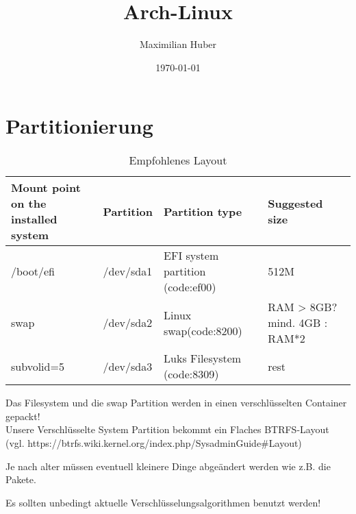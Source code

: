 \documentclass[11pt,a4paper]{article}
\author{Maximilian Huber}
\title{Arch-Linux}
\date{\today}
\begin{document}
\begin{titlepage}
\maketitle
\thispagestyle{empty}
\end{titlepage}

\tableofcontents
\thispagestyle{empty}	
\cleardoublepage
\setcounter{page}{1}

\section{Partitionierung}
\begin{table}[h]
\begin{tabular}{|p{3cm}|p{3cm}|p{3cm}| p{3cm} |}
\hline
Mount point on the installed system & Partition & Partition type   &  Suggested size \\ \hline
/boot/efi & /dev/sda1  & EFI system partition (code:ef00)  & 512M \\ \hline
swap & /dev/sda2  & Linux swap(code:8200)  & RAM > 8GB? mind. 4GB : RAM*2 \\ \hline
subvolid=5 & /dev/sda3  & Luks Filesystem (code:8309)  & rest  \\ \hline
\end{tabular}
\caption{Empfohlenes Layout}
\end{table}

Das Filesystem und die swap Partition werden in einen verschlüsselten Container gepackt!\\

Unsere Verschlüsselte System Partition bekommt ein Flaches BTRFS-Layout (vgl. https://btrfs.wiki.kernel.org/index.php/SysadminGuide\#Layout)

Je nach alter müssen eventuell kleinere Dinge abgeändert werden wie z.B. die Pakete.

Es sollten unbedingt aktuelle Verschlüsselungsalgorithmen benutzt werden!
\end{document}
